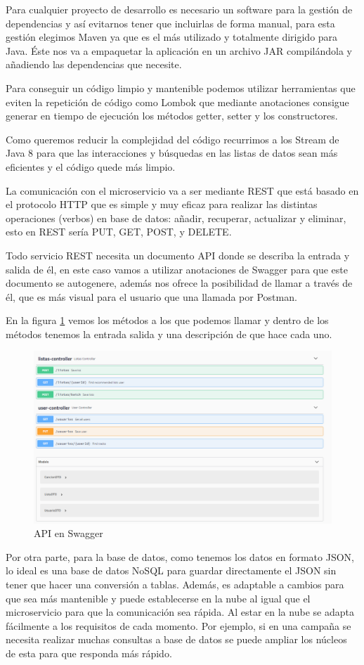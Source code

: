 \documentclass[12pt]{report} %
\begin{document}
Para cualquier proyecto de desarrollo es necesario un software para la gestión de dependencias y así evitarnos tener que incluirlas de forma manual, para esta gestión elegimos Maven ya que es el más utilizado y totalmente dirigido para Java. Éste nos va a empaquetar la aplicación en un archivo JAR compilándola y añadiendo las dependencias que necesite.

Para conseguir un código limpio y mantenible podemos utilizar herramientas que eviten la repetición de código como Lombok que mediante anotaciones consigue generar en tiempo de ejecución los métodos getter, setter y los constructores.

Como queremos reducir la complejidad del código recurrimos a los Stream de Java 8 para que las  interacciones y búsquedas en las listas de datos sean más eficientes y el código quede más limpio.

La comunicación con el microservicio va a ser mediante REST que está basado en el protocolo HTTP que es simple y muy eficaz para realizar las distintas operaciones (verbos) en base de datos: añadir, recuperar, actualizar y eliminar, esto en REST sería PUT, GET, POST, y DELETE.

Todo servicio REST necesita un documento API donde se describa la entrada y salida de él, en este caso vamos a utilizar anotaciones de Swagger para que este documento se autogenere, además nos ofrece la posibilidad de llamar a través de él, que es más visual para el usuario que una llamada por Postman.

En la figura \ref{fig:capturaswagger} vemos los métodos a los que podemos llamar y dentro de los métodos tenemos la entrada salida y una descripción de que hace cada uno.
\begin{figure}
	\centering
	\includegraphics[width=0.7\linewidth]{imagenes/CapturaSwagger}
	\caption{API en Swagger}
	\label{fig:capturaswagger}
\end{figure}


Por otra parte, para la base de datos, como tenemos los datos en formato JSON, lo ideal es una base de datos NoSQL para guardar directamente el JSON sin tener que hacer una conversión a tablas. Además, es adaptable a cambios para que sea más mantenible y puede establecerse en la nube al igual que el microservicio para que la comunicación sea rápida. Al estar en la nube se adapta fácilmente a los requisitos de cada momento. Por ejemplo, si en una campaña se necesita realizar muchas consultas a base de datos se puede ampliar los núcleos de esta para que responda más rápido.
\end{document}

